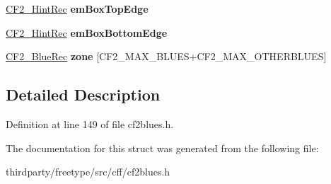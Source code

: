 \begin{DoxyCompactItemize}
\hyperlink{struct_c_f2___hint_rec__}{C\+F2\+\_\+\+Hint\+Rec} {\bfseries em\+Box\+Top\+Edge}
\item 
\mbox{\label{struct_c_f2___blues_rec___ad6497e5526fdfdc1a26dd4ebfbbe5f73}} 
\hyperlink{struct_c_f2___hint_rec__}{C\+F2\+\_\+\+Hint\+Rec} {\bfseries em\+Box\+Bottom\+Edge}
\item 
\mbox{\label{struct_c_f2___blues_rec___a979b72a40b6652540fcd3e06de97efa9}} 
\hyperlink{struct_c_f2___blue_rec__}{C\+F2\+\_\+\+Blue\+Rec} {\bfseries zone} \mbox{[}C\+F2\+\_\+\+M\+A\+X\+\_\+\+B\+L\+U\+ES+C\+F2\+\_\+\+M\+A\+X\+\_\+\+O\+T\+H\+E\+R\+B\+L\+U\+ES\mbox{]}
\end{DoxyCompactItemize}


\subsection{Detailed Description}


Definition at line 149 of file cf2blues.\+h.



The documentation for this struct was generated from the following file\+:\begin{DoxyCompactItemize}
\item 
thirdparty/freetype/src/cff/cf2blues.\+h\end{DoxyCompactItemize}
